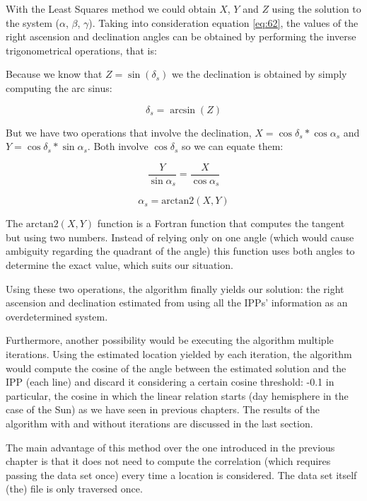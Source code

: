 With the Least Squares method we could obtain $X$, $Y$ and $Z$ using the solution to the system ($\alpha$, $\beta$, $\gamma$). Taking into consideration equation \ref{eq:62}, the values of the right ascension and declination angles can be obtained by performing the inverse trigonometrical operations, that is:

Because we know that $Z=\sin(\delta_{s})$ we the declination is obtained by simply computing the arc sinus:

\begin{equation} \label{eq:inverseTrigoTriennal}
\delta_{s} = \arcsin(Z)
\end{equation}

But we have two operations that involve the declination, $X=\cos\delta_{s} * \cos\alpha_{s}$ and $Y=\cos\delta_{s} * \sin\alpha_{s}$. Both involve $\cos\delta_{s}$ so we can equate them:

\begin{equation} \label{eq:rmCos}
\frac{Y}{\sin\alpha_{s}} = \frac{X}{\cos\alpha_{s}}
\end{equation}


\begin{equation} \label{eq:inverseTrigoAtan}
\alpha_{s} = \text{arctan2}(X,Y)
\end{equation}

The $\text{arctan2}(X,Y)$ function is a Fortran function that computes the tangent but using two numbers. Instead of relying only on one angle (which would cause ambiguity regarding the quadrant of the angle) this function uses both angles to determine the exact value, which suits our situation.

Using these two operations, the algorithm finally yields our solution: the right ascension and declination estimated from using all the IPPs' information as an overdetermined system.

Furthermore, another possibility would be executing the algorithm multiple iterations. Using the estimated location yielded by each iteration, the algorithm would compute the cosine of the angle between the estimated solution and the IPP (each line) and discard it considering a certain cosine threshold: -0.1 in particular, the cosine in which the linear relation starts (day hemisphere in the case of the Sun) as we have seen in previous chapters. The results of the algorithm with and without iterations are discussed in the last section.

The main advantage of this method over the one introduced in the previous chapter is that it does not need to compute the correlation (which requires passing the data set once) every time a location is considered. The data set itself (the) file is only traversed once.

